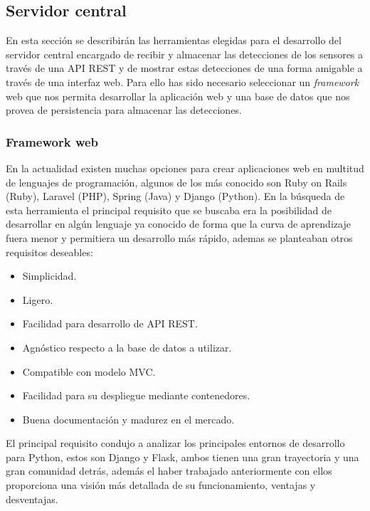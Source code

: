 \documentclass[../proyecto.tex]{subfiles}
\begin{document}
\subsection{Servidor central}

En esta sección se describirán las herramientas elegidas para el desarrollo del servidor central encargado de recibir y almacenar las detecciones de los sensores a través de una API REST y de mostrar estas detecciones de una forma amigable a través de una interfaz web. Para ello has sido necesario seleccionar un \textit{framework} web que nos permita desarrollar la aplicación web y una base de datos que nos provea de persistencia para almacenar las detecciones.

\subsubsection{Framework web}

En la actualidad existen muchas opciones para crear aplicaciones web en multitud de lenguajes de programación, algunos de los más conocido son Ruby on Rails (Ruby), Laravel (PHP), Spring (Java) y Django (Python). En la búsqueda de esta herramienta el principal requisito que se buscaba era la posibilidad de desarrollar en algún lenguaje ya conocido de forma que la curva de aprendizaje fuera menor y permitiera un desarrollo más rápido, ademas se planteaban otros requisitos deseables:

\begin{itemize}
  \item Simplicidad.
  \item Ligero.
  \item Facilidad para desarrollo de API REST.
  \item Agnóstico respecto a la base de datos a utilizar.
  \item Compatible con modelo MVC.
  \item Facilidad para su despliegue mediante contenedores.
  \item Buena documentación y madurez en el mercado.
\end{itemize}

El principal requisito condujo a analizar los principales entornos de desarrollo para Python, estos son Django y Flask, ambos tienen una gran trayectoria y una gran comunidad detrás, además el haber trabajado anteriormente con ellos proporciona una visión más detallada de su funcionamiento, ventajas y desventajas.\\
\end{document}
